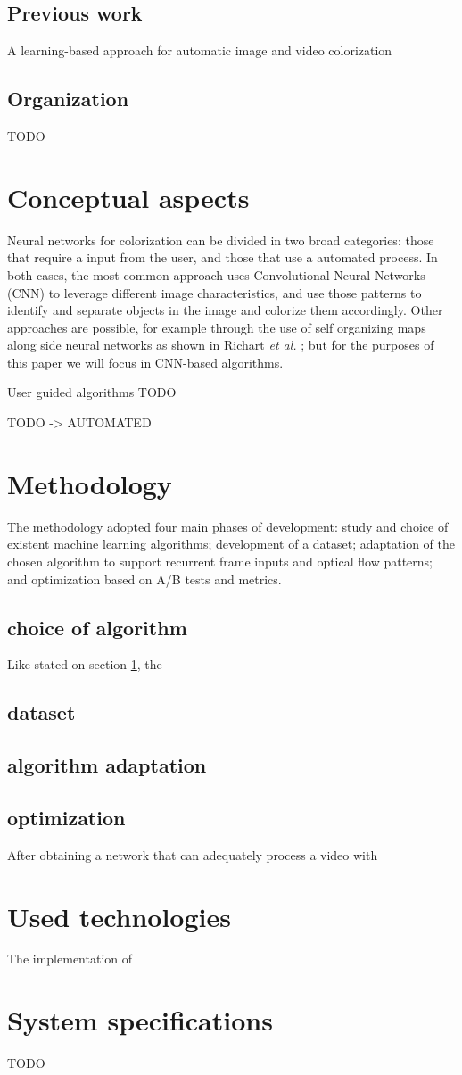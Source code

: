\documentclass[12pt,openright,twoside,a4paper,brazil]{abntex2}
\begin{document}
\subsection{Previous work}
A learning-based approach for automatic image and video colorization

\subsection{Organization}
TODO

\section{Conceptual aspects} \label{sec:Concept}
Neural networks for colorization can be divided in two broad categories: those that require a input from the user, and those that use a automated process. In both cases, the most common approach uses Convolutional Neural Networks (CNN) to leverage different image characteristics, and use those patterns to identify and separate objects in the image and colorize them accordingly. Other approaches are possible, for example through the use of self organizing maps along side neural networks as shown in Richart \textit{et al.} \cite{Richart_som_nn}; but for the purposes of this paper we will focus in CNN-based algorithms.

User guided algorithms TODO

TODO -> AUTOMATED

\section{Methodology}
The methodology adopted four main phases of development: study and choice of existent machine learning algorithms; development of a dataset; adaptation of the chosen algorithm to support recurrent frame inputs and optical flow patterns; and optimization based on A/B tests and metrics.

\subsection{choice of algorithm}
Like stated on section \ref{sec:Concept}, the

\subsection{dataset}

\subsection{algorithm adaptation}

\subsection{optimization}
After obtaining a network that can adequately process a video with

\section{Used technologies}
The implementation of

\section{System specifications}
TODO


\end{document}

